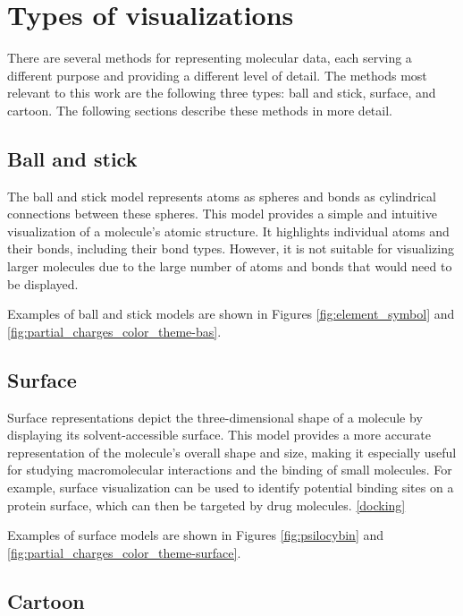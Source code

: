 \documentclass[
  digital,     %
  oneside,     %
  nosansbold,  %
  nocolorbold, %
  lof,         %
  lot,         %
]{fithesis4}
\begin{document}
\section{Types of visualizations}
\label{section:types_of_visualizations}


There are several methods for representing molecular data, each serving a different purpose and providing a different level of detail. The methods most relevant to this work are the following three types: ball and stick, surface, and cartoon. The following sections describe these methods in more detail.

\subsection{Ball and stick}
\label{subsection:ball_and_stick}

The ball and stick model represents atoms as spheres and bonds as cylindrical connections between these spheres. This model provides a simple and intuitive visualization of a molecule's atomic structure. It highlights individual atoms and their bonds, including their bond types. However, it is not suitable for visualizing larger molecules due to the large number of atoms and bonds that would need to be displayed.

Examples of ball and stick models are shown in Figures \ref{fig:element_symbol} and \ref{fig:partial_charges_color_theme-bas}.

\subsection{Surface}
\label{subsection:surface}

Surface representations depict the three-dimensional shape of a molecule by displaying its solvent-accessible surface. This model provides a more accurate representation of the molecule's overall shape and size, making it especially useful for studying macromolecular interactions and the binding of small molecules.
For example, surface visualization can be used to identify potential binding sites on a protein surface, which can then be targeted by drug molecules. \ref{docking}

Examples of surface models are shown in Figures \ref{fig:psilocybin} and \ref{fig:partial_charges_color_theme-surface}.

\subsection{Cartoon}
\label{subsection:cartoon}
\end{document}
